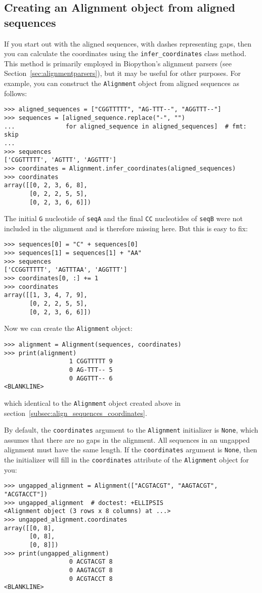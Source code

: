 \subsection{Creating an Alignment object from aligned sequences}
\label{subsec:align_infer_coordinates}

If you start out with the aligned sequences, with dashes representing gaps, then you can calculate the coordinates using the \verb|infer_coordinates| class method. This method is primarily employed in Biopython's alignment parsers (see Section~\ref{sec:alignmentparsers}), but it may be useful for other purposes. For example, you can construct the \verb|Alignment| object from aligned sequences as follows:
\begin{verbatim}
>>> aligned_sequences = ["CGGTTTTT", "AG-TTT--", "AGGTTT--"]
>>> sequences = [aligned_sequence.replace("-", "")
...              for aligned_sequence in aligned_sequences]  # fmt: skip
...
>>> sequences
['CGGTTTTT', 'AGTTT', 'AGGTTT']
>>> coordinates = Alignment.infer_coordinates(aligned_sequences)
>>> coordinates
array([[0, 2, 3, 6, 8],
       [0, 2, 2, 5, 5],
       [0, 2, 3, 6, 6]])
\end{verbatim}
The initial \verb|G| nucleotide of \verb|seqA| and the final \verb|CC| nucleotides of \verb|seqB| were not included in the alignment and is therefore missing here. But this is easy to fix:
\begin{verbatim}
>>> sequences[0] = "C" + sequences[0]
>>> sequences[1] = sequences[1] + "AA"
>>> sequences
['CCGGTTTTT', 'AGTTTAA', 'AGGTTT']
>>> coordinates[0, :] += 1
>>> coordinates
array([[1, 3, 4, 7, 9],
       [0, 2, 2, 5, 5],
       [0, 2, 3, 6, 6]])
\end{verbatim}
Now we can create the \verb|Alignment| object:
\begin{verbatim}
>>> alignment = Alignment(sequences, coordinates)
>>> print(alignment)
                  1 CGGTTTTT 9
                  0 AG-TTT-- 5
                  0 AGGTTT-- 6
<BLANKLINE>
\end{verbatim}
which identical to the \verb|Alignment| object created above in section~\ref{subsec:align_sequences_coordinates}.

By default, the \verb|coordinates| argument to the \verb|Alignment| initializer is \verb|None|, which assumes that there are no gaps in the alignment. All sequences in an ungapped alignment must have the same length. If the \verb|coordinates| argument is \verb|None|, then the initializer will fill in the \verb|coordinates| attribute of the \verb|Alignment| object for you:
\begin{verbatim}
>>> ungapped_alignment = Alignment(["ACGTACGT", "AAGTACGT", "ACGTACCT"])
>>> ungapped_alignment  # doctest: +ELLIPSIS
<Alignment object (3 rows x 8 columns) at ...>
>>> ungapped_alignment.coordinates
array([[0, 8],
       [0, 8],
       [0, 8]])
>>> print(ungapped_alignment)
                  0 ACGTACGT 8
                  0 AAGTACGT 8
                  0 ACGTACCT 8
<BLANKLINE>
\end{verbatim}

